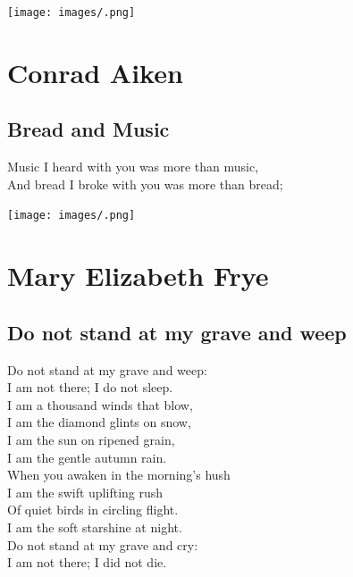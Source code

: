 \documentclass[
]{book}
\renewenvironment{quote}{\begin{VF}}{\end{VF}}
\begin{document}
\texttt{[image: images/.png]}

\hypertarget{conrad-aiken}{%
\chapter{Conrad Aiken}\label{conrad-aiken}}

\hypertarget{bread-and-music}{%
\section{Bread and Music}\label{bread-and-music}}

\begin{quote}
Music I heard with you was more than music,\\
And bread I broke with you was more than bread;
\end{quote}

\texttt{[image: images/.png]}

\hypertarget{mary-elizabeth-frye}{%
\chapter{Mary Elizabeth Frye}\label{mary-elizabeth-frye}}

\hypertarget{do-not-stand-at-my-grave-and-weep}{%
\section{Do not stand at my grave and weep}\label{do-not-stand-at-my-grave-and-weep}}

\begin{quote}
Do not stand at my grave and weep:\\
I am not there; I do not sleep.\\
I am a thousand winds that blow,\\
I am the diamond glints on snow,\\
I am the sun on ripened grain,\\
I am the gentle autumn rain.\\
When you awaken in the morning's hush\\
I am the swift uplifting rush\\
Of quiet birds in circling flight.\\
I am the soft starshine at night.\\
Do not stand at my grave and cry:\\
I am not there; I did not die.
\end{quote}
\end{document}
